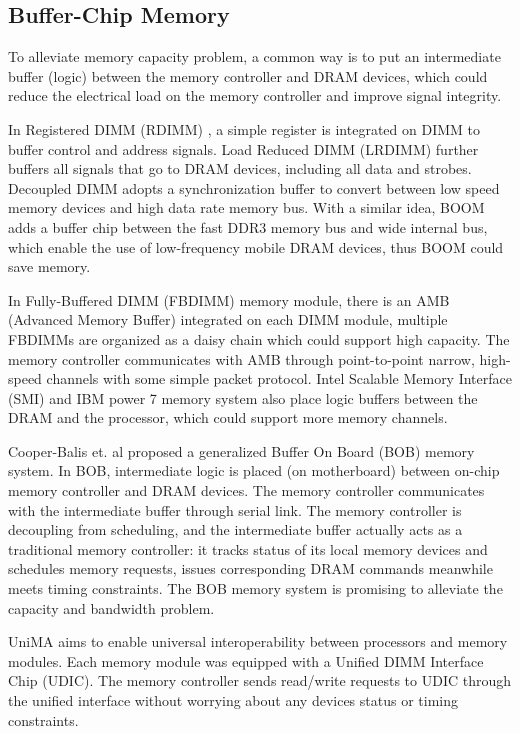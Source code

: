 \documentclass[pageno]{jpaper}
\begin{document}
\subsection {Buffer-Chip Memory}

To alleviate memory capacity problem, a common way is to put an intermediate buffer (logic) between the memory controller and DRAM devices, which could reduce the electrical load on the memory controller and improve signal integrity.

In Registered DIMM (RDIMM) \cite{RDIMM}, a simple register is integrated on DIMM to buffer control and address signals. Load Reduced DIMM (LRDIMM) \cite{LRDIMM} further buffers all signals that go to DRAM devices, including all data and strobes. Decoupled DIMM \cite{DecoupledDIMM} adopts a synchronization buffer to convert between low speed memory devices and high data rate memory bus. With a similar idea, BOOM \cite{BOOM} adds a buffer chip between the fast DDR3 memory bus and wide internal bus, which enable the use of low-frequency mobile DRAM devices, thus BOOM could save memory.

In Fully-Buffered DIMM (FBDIMM) \cite{FBDIMM_Arch,FBDIMM_Datasheet} memory module, there is an AMB (Advanced Memory Buffer) integrated on each DIMM module, multiple FBDIMMs are organized as a daisy chain which could support high capacity. The memory controller communicates with AMB through point-to-point narrow, high-speed channels with some simple packet protocol. Intel Scalable Memory Interface (SMI) \cite{SMBDatasheet} and IBM power 7 memory system \cite{IBMPower7,IBMAMB} also place logic buffers between the DRAM and the processor, which could support more memory channels.

Cooper-Balis et. al \cite{BOBMemory} proposed a generalized Buffer On Board (BOB) memory system. In BOB, intermediate logic is placed (on motherboard) between on-chip memory controller and DRAM devices. The memory controller communicates with the intermediate buffer through serial link. The memory controller is decoupling from scheduling, and the intermediate buffer actually acts as a traditional memory controller: it tracks status of its local memory devices and schedules memory requests, issues corresponding DRAM commands meanwhile meets timing constraints. The BOB memory system is promising to alleviate the capacity and bandwidth problem.

UniMA \cite{UniMA} aims to enable universal interoperability between processors and memory modules. Each memory module was equipped with a Unified DIMM Interface Chip (UDIC). The memory controller sends read/write requests to UDIC through the unified interface without worrying about any devices status or timing constraints.
\end{document}
